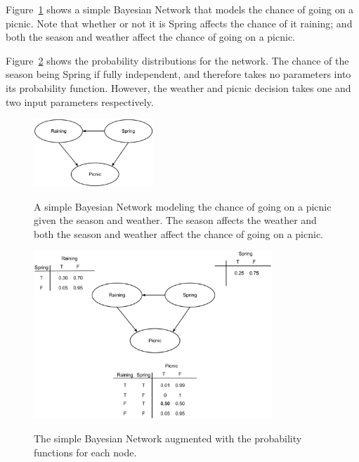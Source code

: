 \documentclass[12pt]{ucthesis}
\newcommand{\captionfonts}{\small\bf\ssp}
\begin{document}
Figure~\ref{fig:bayesNet1} shows a simple Bayesian Network that models the chance of going on a picnic.
Note that whether or not it is Spring affects the chance of it raining; and both the season and weather
affect the chance of going on a picnic.

Figure~\ref{fig:bayesNet2} shows the probability distributions for the network. The chance of the season being Spring if
fully independent, and therefore takes no parameters into its probability function. However, the weather and picnic decision
takes one and two input parameters respectively.

\begin{figure}
   \begin{center}
      \includegraphics[width=0.4\textwidth]{images/Bayes_Net_1.eps}
      \captionfonts
      \caption[Simple Bayes Net]{A simple Bayesian Network modeling the chance of going on a picnic given the season and weather. The season affects the weather and both the season and weather affect the chance of going on a picnic.}
      \label{fig:bayesNet1}
   \end{center}
\end{figure}

\begin{figure}
   \begin{center}
      \includegraphics[width=0.8\textwidth]{images/Bayes_Net_2.eps}
      \captionfonts
      \caption[Bayes Net With Probabilities]{The simple Bayesian Network augmented with the probability functions for each node.}
      \label{fig:bayesNet2}
   \end{center}
\end{figure}
\end{document}
